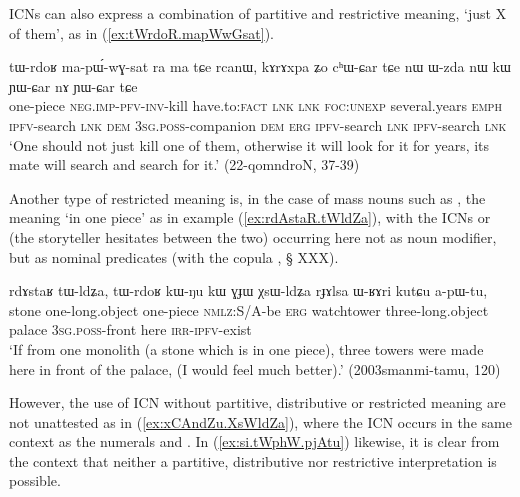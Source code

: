 ICNs can also express a combination of partitive and restrictive meaning, `just X of them', as in (\ref{ex:tWrdoR.mapWwGsat}).

\begin{exe}
\ex \label{ex:tWrdoR.mapWwGsat}
 \gll 
tɯ-rdoʁ ma-pɯ́-wɣ-sat ra ma tɕe rcanɯ, kɤrɤxpa ʑo cʰɯ-ɕar tɕe nɯ ɯ-zda nɯ kɯ ɲɯ-ɕar nɤ ɲɯ-ɕar tɕe \\
one-piece \textsc{neg}.\textsc{imp}-\textsc{pfv}-\textsc{inv}-kill have.to:\textsc{fact} \textsc{lnk} \textsc{lnk} \textsc{foc}:\textsc{unexp} several.years \textsc{emph} \textsc{ipfv}-search \textsc{lnk} \textsc{dem} \textsc{3sg}.\textsc{poss}-companion \textsc{dem} \textsc{erg} \textsc{ipfv}-search \textsc{lnk} \textsc{ipfv}-search \textsc{lnk} \\
\glt `One should not just kill one of them, otherwise it will look for it for years, its mate will search and search for it.' (22-qomndroN, 37-39)
\end{exe}

Another type of restricted meaning is, in the case of mass nouns such as , the meaning `in one piece' as in example (\ref{ex:rdAstaR.tWldZa}), with the ICNs  or  (the storyteller hesitates between the two) occurring here not as noun modifier, but as nominal predicates (with the copula , § XXX).

\begin{exe}
\ex \label{ex:rdAstaR.tWldZa}
\gll rdɤstaʁ tɯ-ldʑa, tɯ-rdoʁ kɯ-ŋu kɯ ɣɟɯ χsɯ-ldʑa rɟɤlsa ɯ-ʁɤri kutɕu a-pɯ-tu, \\
stone one-long.object one-piece \textsc{nmlz}:S/A-be \textsc{erg} watchtower three-long.object palace \textsc{3sg}.\textsc{poss}-front here \textsc{irr}-\textsc{ipfv}-exist \\
\glt `If from one monolith (a stone which is in one piece), three  towers were made here in front of the palace, (I would feel much better).'  (2003smanmi-tamu, 120)
\end{exe} 

However, the use of ICN without partitive, distributive or restricted meaning are not unattested as in  (\ref{ex:xCAndZu.XsWldZa}), where the ICN  occurs in the same context as the numerals  and . In (\ref{ex:si.tWphW.pjAtu}) likewise, it is clear from the context that neither a partitive, distributive nor restrictive interpretation is possible.

